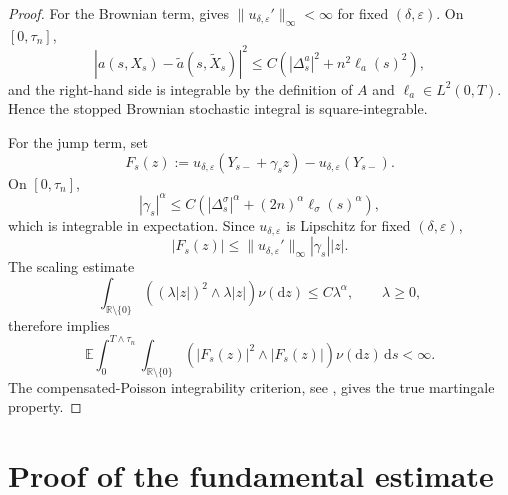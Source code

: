 \documentclass[11pt]{article}
\newcommand{\R}{\mathbb{R}}
\newcommand{\E}{\mathbb{E}}
\newcommand{\1}{\mathbf{1}}
\newcommand{\dd}{\,\mathrm{d}}
\newcommand{\md}{\mathrm{d}}
\newcommand{\wt}{\tilde}
\newcommand{\eps}{\varepsilon}
\begin{document}
\begin{proof}
For the Brownian term,  gives $\|u_{\delta,\eps}'\|_\infty<\infty$ for fixed $(\delta,\eps)$. On $[0,\tau_n]$,
\[
|a(s,X_s)-\wt a(s,\wt X_s)|^2
\le C\left(|\Delta_s^a|^2+n^2\ell_a(s)^2\right),
\]
and the right-hand side is integrable by the definition of $A$ and $\ell_a\in L^2(0,T)$. Hence the stopped Brownian stochastic integral is square-integrable.

For the jump term, set
\[
  F_s(z):=u_{\delta,\eps}(Y_{s-}+\gamma_s z)-u_{\delta,\eps}(Y_{s-}).
\]
On $[0,\tau_n]$,
\[
  |\gamma_s|^\alpha
  \le C\left(|\Delta_s^\sigma|^\alpha+(2n)^\alpha \ell_\sigma(s)^\alpha\right),
\]
which is integrable in expectation. Since $u_{\delta,\eps}$ is Lipschitz for fixed $(\delta,\eps)$,
\[
|F_s(z)|\le \|u_{\delta,\eps}'\|_\infty |\gamma_s||z|.
\]
The scaling estimate
\[
\int_{\R\setminus\{0\}}
\left((\lambda |z|)^2\wedge \lambda |z|\right)\nu(\md z)
\le C\lambda^\alpha,
\qquad \lambda\ge0,
\]
therefore implies
\[
\E\int_0^{T\wedge\tau_n}\int_{\R\setminus\{0\}}
\left(|F_s(z)|^2\wedge |F_s(z)|\right)\nu(\md z)\dd s<\infty.
\]
The compensated-Poisson integrability criterion, see \cite[Ch.~II]{IkedaWatanabe1989}, gives the true martingale property.
\end{proof}


\section{Proof of the fundamental estimate}
\label{sec:proof-fundamental}
\end{document}
